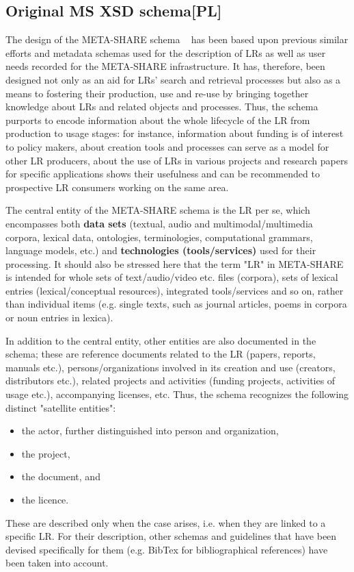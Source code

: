 \documentclass{llncs}
\begin{document}
\subsection{Original MS XSD schema[PL]}
\label{sec:xsd}

The design of the META-SHARE schema ~\cite{gavrilidou2012metashare} has been based upon previous similar efforts and metadata schemas used for the description of LRs as well as user needs recorded for the META-SHARE infrastructure. It
has, therefore,  been designed not only as an aid for LRs' search and retrieval processes but also as a means to fostering their production, use and re-use by bringing together knowledge about LRs and related objects and processes. Thus, the schema purports to encode information about the whole lifecycle of the LR from production to usage stages: for instance, information about funding is of interest to policy makers, about creation tools and processes can serve as a model for other LR producers, about the use of LRs in various projects and research papers for specific applications shows their usefulness and can be recommended to prospective LR consumers working on the same area. 

The central entity of the META-SHARE schema is the LR per se, which encompasses both {\bf data sets} (textual, audio and multimodal/multimedia corpora, lexical data, ontologies, terminologies, computational grammars, language models, etc.) and {\bf technologies (tools/services)} used for their processing. It should also be stressed here that the term "LR" in META-SHARE is intended for whole sets of text/audio/video etc. files (corpora), sets of lexical entries (lexical/conceptual resources), integrated tools/services and so on, rather than individual items (e.g. single texts, such as journal articles, poems in corpora or noun entries in lexica).

In addition to the central entity, other entities are also documented in the schema; these are reference documents related to the LR (papers, reports, manuals etc.), persons/organizations involved in its creation and use (creators, distributors etc.), related projects and activities (funding projects, activities of usage etc.), accompanying licenses, etc. Thus, the schema recognizes the following distinct "satellite entities":
\begin{itemize}
\item the actor, further distinguished into person and organization,
\item the project,
\item the document, and
\item the licence.
\end{itemize}
These are described only when the case arises, i.e. when they are linked to a specific LR. For their description, other schemas and guidelines that have been devised specifically for them (e.g. BibTex for bibliographical references) have been taken into account.
\end{document}
